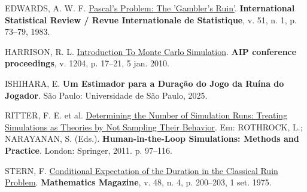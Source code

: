 \documentclass[
  brazilian,
  12pt,
]{article}
\newlength{\cslhangindent}
\newenvironment{CSLReferences}[2] %
 {\begin{list}{}{%
  \setlength{\itemindent}{0pt}
  \setlength{\leftmargin}{0pt}
  \setlength{\parsep}{0pt}
  \ifodd #1
   \setlength{\leftmargin}{\cslhangindent}
   \setlength{\itemindent}{-1\cslhangindent}
  \fi
  \setlength{\itemsep}{#2\baselineskip}}}
 {\end{list}}
\theoremstyle{definition}
\theoremstyle{remark}
\begin{document}
\protect{}\label{refs}
\begin{CSLReferences}{0}{1}
EDWARDS, A. W. F. \href{https://doi.org/10.2307/1402732}{Pascal's
Problem: The 'Gambler's Ruin'}. \textbf{International Statistical Review
/ Revue Internationale de Statistique}, v. 51, n. 1, p. 73--79, 1983.

HARRISON, R. L. \href{https://doi.org/10.1063/1.3295638}{Introduction To
Monte Carlo Simulation}. \textbf{{AIP} conference proceedings}, v. 1204,
p. 17--21, 5 jan. 2010.

ISHIHARA, E. \textbf{Um Estimador para a Duração do Jogo da Ruína do
Jogador}. São Paulo: Universidade de São Paulo, 2025.

RITTER, F. E. et al.
\href{https://doi.org/10.1007/978-0-85729-883-6_5}{Determining the
Number of Simulation Runs: Treating Simulations as Theories by Not
Sampling Their Behavior}. Em: ROTHROCK, L.; NARAYANAN, S. (Eds.).
\textbf{Human-in-the-Loop Simulations: Methods and Practice}. London:
Springer, 2011. p. 97--116.

STERN, F.
\href{https://doi.org/10.1080/0025570X.1975.11976486}{Conditional
Expectation of the Duration in the Classical Ruin Problem}.
\textbf{Mathematics Magazine}, v. 48, n. 4, p. 200--203, 1 set. 1975.

\end{CSLReferences}
\end{document}
